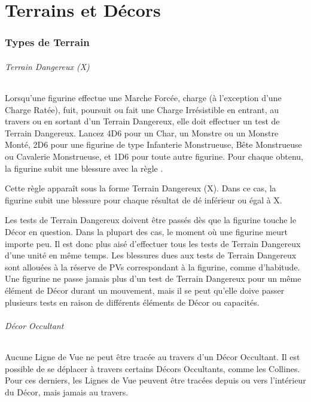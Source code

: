 
\part{Terrains et Décors}

\hypertarget{terraintypes}{\section{Types de Terrain}}
\label{terrain_types}

\hypertarget{dangerousterrain}{\paragraph{Terrain Dangereux (X)}}

Lorsqu'une figurine effectue une Marche Forcée, charge (à l'exception d'une Charge Ratée), fuit, poursuit ou fait une Charge Irrésistible en entrant, au travers ou en sortant d'un Terrain Dangereux, elle doit effectuer un test de Terrain Dangereux. Lancez 4D6 pour un Char, un Monstre ou un Monstre Monté, 2D6 pour une figurine de type Infanterie Monstrueuse, Bête Monstrueuse ou Cavalerie Monstrueuse, et 1D6 pour toute autre figurine. Pour chaque  obtenu, la figurine subit une blessure avec la règle .

Cette règle apparaît sous la forme Terrain Dangereux (X). Dans ce cas, la figurine subit une blessure pour chaque résultat de dé inférieur ou égal à X.

Les tests de Terrain Dangereux doivent être passés dès que la figurine touche le Décor en question. Dans la plupart des cas, le moment où une figurine meurt importe peu. Il est donc plus aisé d'effectuer tous les tests de Terrain Dangereux d'une unité en même temps. Les blessures dues aux tests de Terrain Dangereux sont allouées à la réserve de PVs correspondant à la figurine, comme d'habitude. Une figurine ne passe jamais plus d'un test de Terrain Dangereux pour un même élément de Décor durant un mouvement, mais il se peut qu'elle doive passer plusieurs tests en raison de différents éléments de Décor ou capacités.

\paragraph{Décor Occultant}

Aucune Ligne de Vue ne peut être tracée au travers d'un Décor Occultant. Il est possible de se déplacer à travers certains Décors Occultants, comme les Collines. Pour ces derniers, les Lignes de Vue peuvent être tracées depuis ou vers l'intérieur du Décor, mais jamais au travers. 

